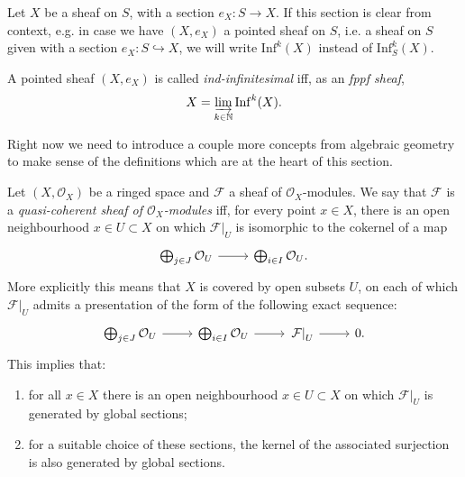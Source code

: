 \documentclass[../Main]{subfiles}
\begin{document}
\begin{ntt}[]
	Let $X$ be a sheaf on $S$, with a section $e_X\colon S \to X$.
	If this section is clear from context, e.g. in case we have
	$(X, e_X)$ a pointed sheaf on $S$, i.e. a sheaf on $S$
	given with a section $e_X\colon S \hookrightarrow X$,
	we will write $\mathrm{Inf}^k(X)$
	instead of $\mathrm{Inf}_S^k(X)$.
\end{ntt}


\begin{defn}
	A pointed sheaf $\left(X, e_X\right)$ is called {\em ind-infinitesimal} iff,
	as an {\em fppf sheaf},
	\begin{equation*}
		X = \varinjlim_{k \in \mathbb{N}} \mathrm{Inf}^k(X)
	.\end{equation*}
\end{defn}


\noindent
Right now we need to introduce a couple more concepts from algebraic
geometry to make sense of the definitions which are at the heart of this section.
\begin{defn}
	Let $( X , \mathcal{O}_{ X } )$ be a ringed space and
	$\mathcal{F}$ a sheaf of $\mathcal{O}_{ X }$-modules.
	We say that $\mathcal{F}$ is a {\em quasi-coherent sheaf of $\mathcal{O}_{ X }$-modules}
	iff, for every point $x \in X$, there is an open neighbourhood $x \in U \subset X$
	on which $\left.\mathcal{F}\right|_{U}$ is isomorphic to the cokernel
	of a map
	\begin{equation*}
	\begin{tikzcd}[row sep = 0ex
		,/tikz/column 1/.append style={anchor=base east}
		,/tikz/column 2/.append style={anchor=base west}]
		\bigoplus_{j \in J} \mathcal{O}_{ U } \arrow[r, "", rightarrow] &
		\bigoplus_{i \in I} \mathcal{O}_{ U }
	.\end{tikzcd}
	\end{equation*}
	More explicitly this means that $X$ is covered by open subsets $U$,
	on each of which $\left.\mathcal{F}\right|_{U}$ admits a presentation
	of the form of the following exact sequence:
	\begin{equation*}
	\begin{tikzcd}[row sep = 0ex]
		\bigoplus_{j \in J} \mathcal{O}_{ U } \arrow[r, "", rightarrow] &
		\bigoplus_{i \in I} \mathcal{O}_{ U } \arrow[r, "", rightarrow] &
		\left.\mathcal{F}\right|_{U} \arrow[r, "", rightarrow] &
		0
	.\end{tikzcd}
	\end{equation*}
	This implies that:
	\begin{enumerate}
		\item for all $x \in X$ there is an open neighbourhood $x \in U \subset X$
			on which $\left.\mathcal{F}\right|_{U}$ is generated by global sections;

		\item for a suitable choice of these sections, the kernel of the associated surjection
			is also generated by global sections.
	\end{enumerate}
\end{defn}
\end{document}
